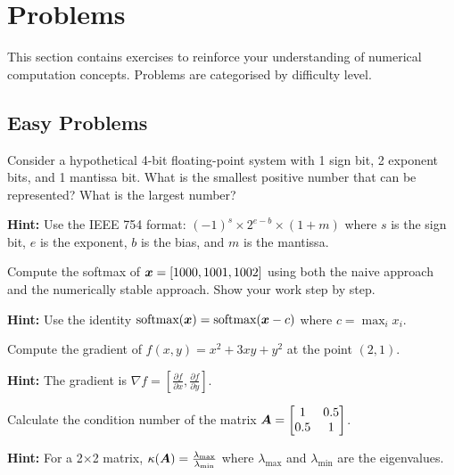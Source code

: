 






\section{Problems}
\label{sec:problems}

This section contains exercises to reinforce your understanding of numerical computation concepts. Problems are categorised by difficulty level.

\subsection{Easy Problems}

\begin{problem}
\label{prob:float-basics}
Consider a hypothetical 4-bit floating-point system with 1 sign bit, 2 exponent bits, and 1 mantissa bit. What is the smallest positive number that can be represented? What is the largest number?

\textbf{Hint:} Use the IEEE 754 format: $(-1)^s \times 2^{e-b} \times (1 + m)$ where $s$ is the sign bit, $e$ is the exponent, $b$ is the bias, and $m$ is the mantissa.
\end{problem}

\begin{problem}
\label{prob:softmax-stability}
Compute the softmax of $\boldsymbol{x} = [1000, 1001, 1002]$ using both the naive approach and the numerically stable approach. Show your work step by step.

\textbf{Hint:} Use the identity $\text{softmax}(\boldsymbol{x}) = \text{softmax}(\boldsymbol{x} - c)$ where $c = \max_i x_i$.
\end{problem}

\begin{problem}
\label{prob:gradient-computation}
Compute the gradient of $f(x, y) = x^2 + 3xy + y^2$ at the point $(2, 1)$.

\textbf{Hint:} The gradient is $\nabla f = \left[\frac{\partial f}{\partial x}, \frac{\partial f}{\partial y}\right]$.
\end{problem}

\begin{problem}
\label{prob:condition-number}
Calculate the condition number of the matrix $\boldsymbol{A} = \begin{bmatrix} 1 & 0.5 \\ 0.5 & 1 \end{bmatrix}$.

\textbf{Hint:} For a 2×2 matrix, $\kappa(\boldsymbol{A}) = \frac{\lambda_{\max}}{\lambda_{\min}}$ where $\lambda_{\max}$ and $\lambda_{\min}$ are the eigenvalues.
\end{problem}


